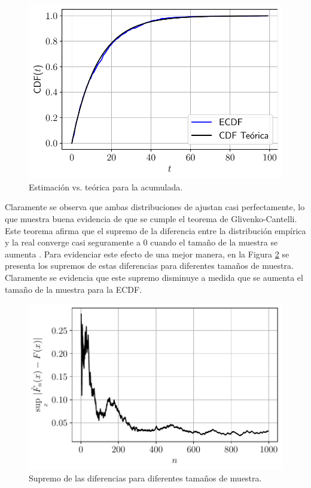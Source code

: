 \documentclass[fleqn]{article}
\begin{document}
\begin{figure}[H]
    \centering
    \includegraphics[scale=.6]{1c_1.pdf}
    \caption{Estimación vs. teórica para la acumulada.}
    \label{fig:1c2}
\end{figure}
Claramente se observa que ambas distribuciones de ajustan casi perfectamente, lo que muestra buena evidencia de que se cumple el teorema de Glivenko-Cantelli. Este teorema afirma que el supremo de la diferencia entre la distribución empírica y la real converge casi seguramente a 0 cuando el tamaño de la muestra se aumenta \cite[p. 14]{wasserman2006}. Para evidenciar este efecto de una mejor manera, en la Figura \ref{fig:1c3} se presenta los supremos de estas diferencias para diferentes tamaños de muestra. Claramente se evidencia que este supremo disminuye a medida que se aumenta el tamaño de la muestra para la ECDF.
\begin{figure}[H]
    \centering
    \includegraphics[scale=.6]{1c_3.pdf}
    \caption{Supremo de las diferencias para diferentes tamaños de muestra.}
    \label{fig:1c3}
\end{figure}
\end{document}
